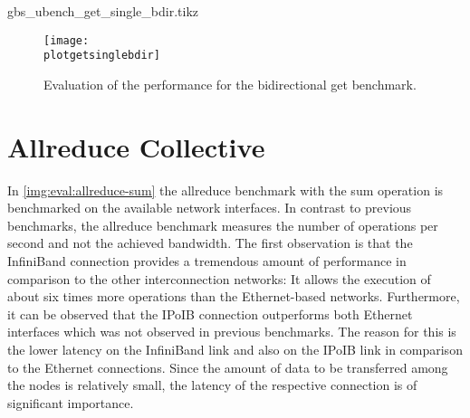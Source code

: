 \newcommand{\plotgetsinglebdir}{gbs_ubench_get_single_bdir.tikz}
\begin{filecontents}{\plotgetsinglebdir}

\newcommand{\csv}{gbs_ubench_get_single_bdir.csv}
\newcommand{\csvgi}{result-gi/\csv}
\newcommand{\csvte}{result-te/\csv}
\newcommand{\csvipoib}{result-ipoib/\csv}
\newcommand{\csvib}{result-ib/\csv}

\end{filecontents}

\begin{figure}[htb]
\centering
\texttt{[image: \\plotgetsinglebdir]}
\caption{Evaluation of the performance for the bidirectional get benchmark.}
\label{img:eval:get-bdir}
\end{figure}


\section{Allreduce Collective}
\label{sec:eval:allreduce}

In \autoref{img:eval:allreduce-sum} the allreduce benchmark with the sum operation is benchmarked on the available network interfaces. In contrast to previous benchmarks, the allreduce benchmark measures the number of operations per second and not the achieved bandwidth. The first observation is that the InfiniBand connection provides a tremendous amount of performance in comparison to the other interconnection networks: It allows the execution of about six times more operations than the Ethernet-based networks. Furthermore, it can be observed that the \ac{IPoIB} connection outperforms both Ethernet interfaces which was not observed in previous benchmarks. The reason for this is the lower latency on the InfiniBand link and also on the \ac{IPoIB} link in comparison to the Ethernet connections. Since the amount of data to be transferred among the nodes is relatively small, the latency of the respective connection is of significant importance.

